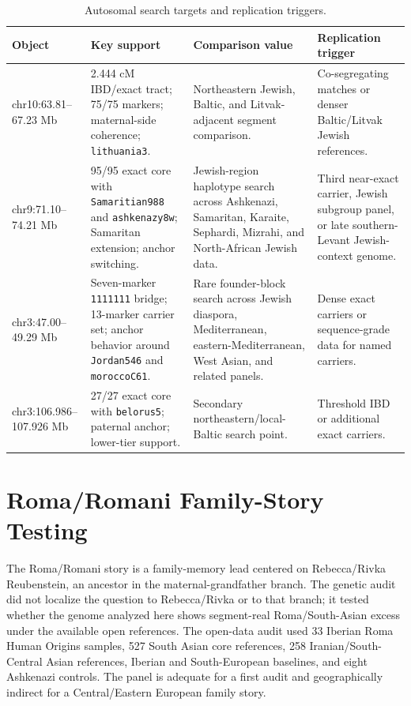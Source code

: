 \documentclass[11pt]{article}
\begin{document}
\begin{table}[htbp]
\centering
\caption{Autosomal search targets and replication triggers.}
\small
\begin{tabularx}{\textwidth}{>{\raggedright\arraybackslash}p{}Y Y Y}
\toprule
Object & Key support & Comparison value & Replication trigger \\
\midrule
chr10:63.81--67.23 Mb & 2.444 cM IBD/exact tract; 75/75 markers; maternal-side coherence; \texttt{lithuania3}. & Northeastern Jewish, Baltic, and Litvak-adjacent segment comparison. & Co-segregating matches or denser Baltic/Litvak Jewish references. \\
chr9:71.10--74.21 Mb & 95/95 exact core with \texttt{Samaritian988} and \texttt{ashkenazy8w}; Samaritan extension; anchor switching. & Jewish-region haplotype search across Ashkenazi, Samaritan, Karaite, Sephardi, Mizrahi, and North-African Jewish data. & Third near-exact carrier, Jewish subgroup panel, or late southern-Levant Jewish-context genome. \\
chr3:47.00--49.29 Mb & Seven-marker \texttt{1111111} bridge; 13-marker carrier set; anchor behavior around \texttt{Jordan546} and \texttt{moroccoC61}. & Rare founder-block search across Jewish diaspora, Mediterranean, eastern-Mediterranean, West Asian, and related panels. & Dense exact carriers or sequence-grade data for named carriers. \\
chr3:106.986--107.926 Mb & 27/27 exact core with \texttt{belorus5}; paternal anchor; lower-tier support. & Secondary northeastern/local-Baltic search point. & Threshold IBD or additional exact carriers. \\
\bottomrule
\end{tabularx}
\end{table}

\section{Roma/Romani Family-Story Testing}

The Roma/Romani story is a family-memory lead centered on Rebecca/Rivka Reubenstein, an ancestor in the maternal-grandfather branch. The genetic audit did not localize the question to Rebecca/Rivka or to that branch; it tested whether the genome analyzed here shows segment-real Roma/South-Asian excess under the available open references. The open-data audit used 33 Iberian Roma Human Origins samples, 527 South Asian core references, 258 Iranian/South-Central Asian references, Iberian and South-European baselines, and eight Ashkenazi controls. The panel is adequate for a first audit and geographically indirect for a Central/Eastern European family story.
\end{document}
